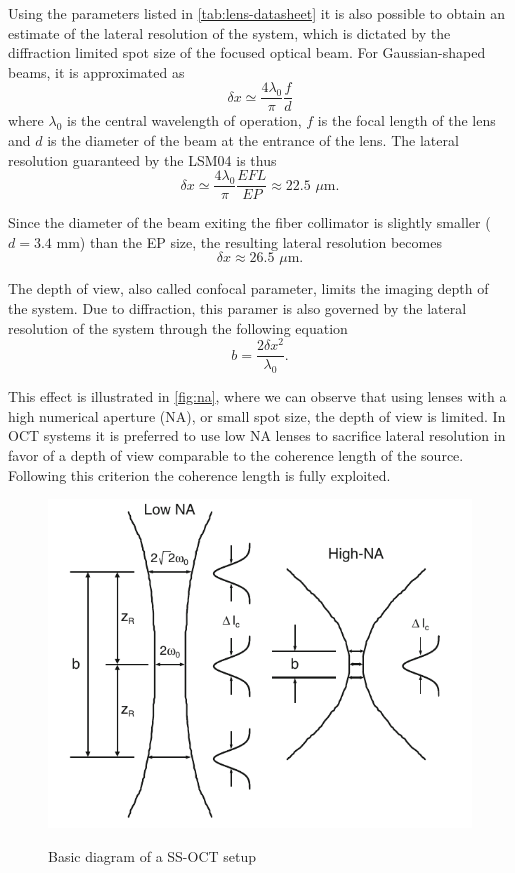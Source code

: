  Using the parameters listed in \autoref{tab:lens-datasheet} it is also possible to obtain an estimate of the lateral resolution of the system, which is dictated by the diffraction limited spot size of the focused optical beam. For Gaussian-shaped beams, it is approximated as \cite{Drexler2015}
 \begin{equation}
 	\delta x \simeq \frac{4\lambda_0}{\pi} \frac{f}{d}
 \end{equation}
 where $\lambda_0$ is the central wavelength of operation, $f$ is the focal length of the lens and $d$ is the diameter of the beam at the entrance of the lens. The lateral resolution guaranteed by the LSM04 is thus
 \begin{equation}
 	\delta x \simeq \frac{4\lambda_0}{\pi} \frac{EFL}{EP} \approx 22.5 \,\,\mu\text{m.}
 \end{equation}
 
 Since the diameter of the beam exiting the fiber collimator is slightly smaller ($d=3.4$ mm) than the EP size, the resulting lateral resolution becomes
 \begin{equation}
	\delta x \approx 26.5 \,\,\mu\text{m}.
 \end{equation}
 
 The depth of view, also called confocal parameter, limits the imaging depth of the system. Due to diffraction, this paramer is also governed by the lateral resolution of the system through the following equation
 \begin{equation}
	 b = \frac{2 \delta x^2}{\lambda_0}.
 \end{equation}
 
 This effect is illustrated in \autoref{fig:na}, where we can observe that using lenses with a high numerical aperture (NA), or small spot size, the depth of view is limited. In OCT systems it is preferred to use low NA lenses to sacrifice lateral resolution in favor of a depth of view comparable to the coherence length of the source. Following this criterion the coherence length is fully exploited. 
 
  \begin{figure}[bth]
 	\myfloatalign
 	{\includegraphics[width=0.6\linewidth]{gfx/ch3/na}}
 	\caption{Basic diagram of a  SS-OCT setup}\label{fig:na}
 \end{figure}
 
